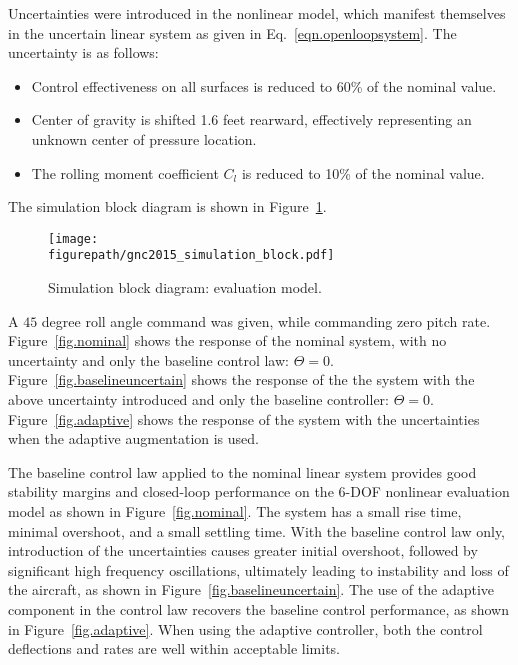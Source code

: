 \documentclass[]{../sty/JGCD}
\newcommand{\figurepath}{../fig}
\theoremstyle{examplestyle}
\begin{document}
   Uncertainties were introduced in the nonlinear model, which manifest themselves in the uncertain linear system as given in Eq.\ \eqref{eqn.openloopsystem}. The uncertainty is as follows:
  \begin{itemize}
    \item{Control effectiveness on all surfaces is reduced to 60\% of the nominal value.}
    \item{Center of gravity is shifted 1.6 feet rearward, effectively representing an unknown center of pressure location.}
    \item{The rolling moment coefficient $C_{l}$ is reduced to 10\% of the nominal value.}
  \end{itemize}
  The simulation block diagram is shown in Figure~\ref{fig.block}.

  \begin{figure}[H]
    \begin{center}
      \texttt{[image: \\figurepath/gnc2015\_simulation\_block.pdf]}
      \vspace{-0.1in}
      \caption{Simulation block diagram: evaluation model.\label{fig.block}}
    \end{center}
  \end{figure}

  A $45$ degree roll angle command was given, while commanding zero pitch rate.
  Figure~\ref{fig.nominal} shows the response of the nominal system, with no uncertainty and only the baseline control law: $\Theta=0$.
  Figure~\ref{fig.baselineuncertain} shows the response of the the system with the above uncertainty introduced and only the baseline controller: $\Theta=0$.
  Figure~\ref{fig.adaptive} shows the response of the system with the uncertainties when the adaptive augmentation is used.

  The baseline control law applied to the nominal linear system provides good stability margins and closed-loop performance on the 6-DOF nonlinear evaluation model as shown in Figure~\ref{fig.nominal}.
  The system has a small rise time, minimal overshoot, and a small settling time.
  With the baseline control law only, introduction of the uncertainties causes greater initial overshoot, followed by significant high frequency oscillations, ultimately leading to instability and loss of the aircraft, as shown in Figure~\ref{fig.baselineuncertain}.
  The use of the adaptive component in the control law recovers the baseline control performance, as shown in Figure~\ref{fig.adaptive}.
  When using the adaptive controller, both the control deflections and rates are well within acceptable limits.
\end{document}
